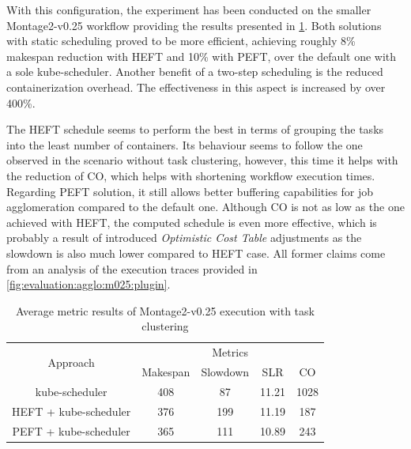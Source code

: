 With this configuration, the experiment has been conducted on the smaller Montage2-v0.25 workflow providing the results presented in \cref{tab:metrics-clustering-m025}.
Both solutions with static scheduling proved to be more efficient, achieving roughly 8\% makespan reduction with HEFT and 10\% with PEFT, over the default one with a sole kube-scheduler.
Another benefit of a two-step scheduling is the reduced containerization overhead.
The effectiveness in this aspect is increased by over 400\%.

The HEFT schedule seems to perform the best in terms of grouping the tasks into the least number of containers.
Its behaviour seems to follow the one observed in the scenario without task clustering, however, this time it helps with the reduction of CO, which helps with shortening workflow execution times.
Regarding PEFT solution, it still allows better buffering capabilities for job agglomeration compared to the default one.
Although CO is not as low as the one achieved with HEFT, the computed schedule is even more effective, which is probably a result of introduced \emph{Optimistic Cost Table} adjustments \cite{b:PEFT} as the slowdown is also much lower compared to HEFT case.
All former claims come from an analysis of the execution traces provided in \cref{fig:evaluation:agglo:m025:plugin}.

\begin{table}[H]
    \centering
    \begin{tabular}{|c|c|c|c|c|}
    \cline{1-5}
        \multirow{2}{*}{Approach} 
        &
        \multicolumn{4}{|c|}{Metrics} \\
    \cline{2-5}
        & Makespan & Slowdown & SLR & CO \\
    \cline{1-5}
        kube-scheduler & 408 & 87 & 11.21 & 1028 \\
    \cline{1-5}
        HEFT + kube-scheduler & 376 & 199 & 11.19 & 187 \\
    \cline{1-5}
        PEFT + kube-scheduler & 365 & 111 & 10.89 & 243 \\
    \cline{1-5}
    \end{tabular}
    \caption{Average metric results of Montage2-v0.25 execution with task clustering}
    \label{tab:metrics-clustering-m025}
\end{table}

